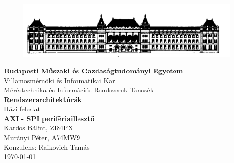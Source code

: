 \documentclass[a4paper,11pt]{article}
\begin{document}
\sloppy

\begin{titlepage}
\begin{center}
\begin{figure}[t!]
	\begin{center}
	\includegraphics[scale=0.2]{bme.png}
	\label{a:bme}
	\end{center}
\end{figure}
\textbf{{Budapesti Műszaki és Gazdaságtudományi Egyetem}}\\
Villamosmérnöki és Informatikai Kar\\
Méréstechnika és Információs Rendszerek Tanszék\\
\vfill
\huge\textbf{{Rendszerarchitektúrák}}\\[3mm]
\Large{Házi feladat}\\[3mm]
\Large\textbf{{AXI - SPI perifériaillesztő}}\\
\vfill
\Large{Kardos Bálint, ZI84PX}\\
\Large{Murányi Péter, A74MW9}\\
\Large{Konzulens: Raikovich Tamás}\\
\vfill
\today \\

\end{center}
\end{titlepage}

\tableofcontents
\thispagestyle{empty}
\clearpage
\setlength{\parindent}{0em}
\setlength{\parskip}{1em}

\setcounter{page}{1}
\setcounter{tocdepth}{4}
\setcounter{secnumdepth}{4}
\end{document}
